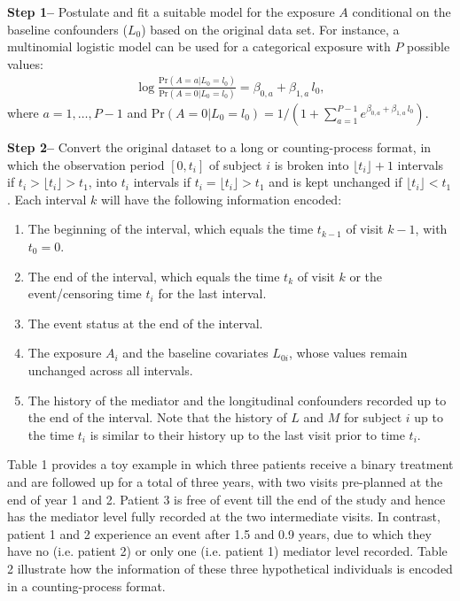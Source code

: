 \documentclass[AMA,STIX1COL]{WileyNJD-v2}
\newcommand{\pr}{\text{Pr}}
\begin{document}
\textbf{Step 1--} Postulate and fit a suitable model for the exposure $A$ conditional on the baseline confounders ($L_0$) based on the original data set. For instance, a multinomial logistic model can be used for a categorical exposure with $P$ possible values:
\begin{align}
\log \frac{\pr (A = a|L_0 = l_0)}{\pr (A = 0|L_0 = l_0)} = \beta_{0,a} + \beta_{1,a}\,l_0,
\end{align}
where $a = 1, \ldots, P - 1$ and $\pr (A = 0|L_0 = l_0) = 1/(1 + \sum_{a = 1}^{P - 1} e^{\beta_{0,a} + \beta_{1,a}\,l_0})$.

\textbf{Step 2--}  Convert the original dataset to a long or counting-process format, in which the observation period $[0, t_i]$ of subject $i$ is broken into $\lfloor t_i \rfloor + 1$ intervals if $t_i>\lfloor t_i \rfloor>t_1$, into $t_i$ intervals if $t_i=\lfloor t_i \rfloor >t_1$ and is kept unchanged if $\lfloor t_i \rfloor<t_1$. Each interval $k$ will have the following information encoded:
\begin{enumerate} 
\item[(a)] The beginning of the interval, which equals the time $t_{k-1}$ of visit $k-1$, with $t_0 = 0$.
\item[(b)] The end of the interval, which equals the time $t_k$ of visit $k$ or the event/censoring time $t_i$ for the last interval.
\item [(c)] The event status at the end of the interval.
\item[(d)] The exposure $A_i$ and the baseline covariates $L_{0i}$, whose values remain unchanged across all intervals.
\item[(e)] The history of the mediator and the longitudinal confounders recorded up to the end of the interval. Note that the history of $L$ and $M$ for subject $i$ up to the time $t_i$ is similar to their history up to the last visit prior to time $t_i$. 
\end{enumerate}
Table 1 provides a toy example in which three patients receive a binary treatment and are followed up for a total of three years, with two visits pre-planned at the end of year 1 and 2. Patient 3 is free of event till the end of the study and hence has the mediator level fully recorded at the two intermediate visits. In contrast, patient 1 and 2 experience an event after 1.5 and 0.9 years, due to which they have no (i.e. patient 2) or only one (i.e. patient 1) mediator level recorded. Table 2 illustrate how the information of these three hypothetical individuals is encoded in a counting-process format. 
\end{document}
